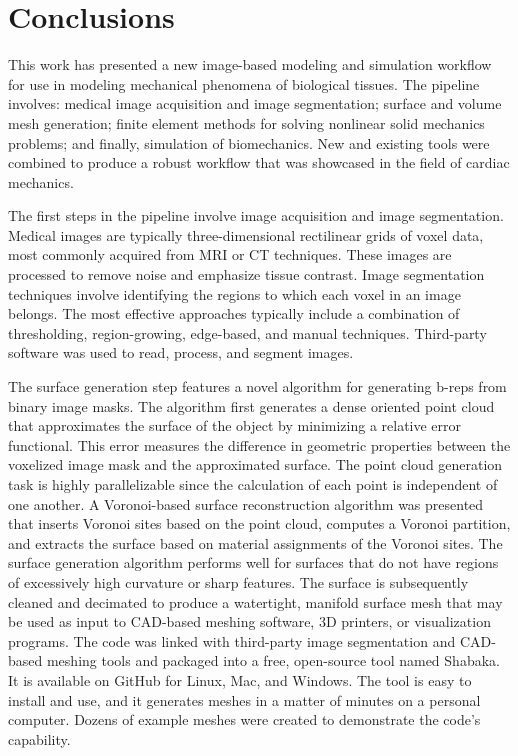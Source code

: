 \chapter{Conclusions}
\label{chap:7}
%

This work has presented a new image-based modeling and simulation workflow for use in modeling mechanical phenomena of biological tissues. The pipeline involves: medical image acquisition and image segmentation; surface and volume mesh generation; finite element methods for solving nonlinear solid mechanics problems; and finally, simulation of biomechanics. New and existing tools were combined to produce a robust workflow that was showcased in the field of cardiac mechanics.

The first steps in the pipeline involve image acquisition and image segmentation. Medical images are typically three-dimensional rectilinear grids of voxel data, most commonly acquired from MRI or CT techniques. These images are processed to remove noise and emphasize tissue contrast. Image segmentation techniques involve identifying the regions to which each voxel in an image belongs. The most effective approaches typically include a combination of thresholding, region-growing, edge-based, and manual techniques. Third-party software was used to read, process, and segment images.

The surface generation step features a novel algorithm for generating b-reps from binary image masks. The algorithm first generates a dense oriented point cloud that approximates the surface of the object by minimizing a relative error functional. This error measures the difference in geometric properties between the voxelized image mask and the approximated surface. The point cloud generation task is highly parallelizable since the calculation of each point is independent of one another. A Voronoi-based surface reconstruction algorithm was presented that inserts Voronoi sites based on the point cloud, computes a Voronoi partition, and extracts the surface based on material assignments of the Voronoi sites. The surface generation algorithm performs well for surfaces that do not have regions of excessively high curvature or sharp features. The surface is subsequently cleaned and decimated to produce a watertight, manifold surface mesh that may be used as input to CAD-based meshing software, 3D printers, or visualization programs. The code was linked with third-party image segmentation and CAD-based meshing tools and packaged into a free, open-source tool named Shabaka. It is available on GitHub for Linux, Mac, and Windows. The tool is easy to install and use, and it generates meshes in a matter of minutes on a personal computer. Dozens of example meshes were created to demonstrate the code's capability.

